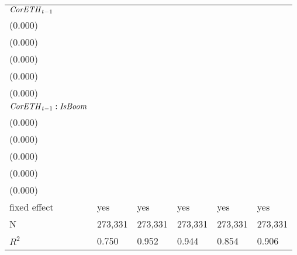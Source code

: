 \begin{tabular}{llllll}
${{\it CorETH}}_{t-1}$                      &  \makecell{$-0.000^{***}$ \\ (0.000)} &      \makecell{$0.000^{}$ \\ (0.000)} &      \makecell{$0.000^{}$ \\ (0.000)} &     \makecell{$-0.000^{}$ \\ (0.000)} &   \makecell{$-0.000^{**}$ \\ (0.000)} \\
${{\it CorETH}}_{t-1} : {\it IsBoom}$       &      \makecell{$0.000^{}$ \\ (0.000)} &     \makecell{$-0.000^{}$ \\ (0.000)} &     \makecell{$-0.000^{}$ \\ (0.000)} &      \makecell{$0.000^{}$ \\ (0.000)} &     \makecell{$-0.000^{}$ \\ (0.000)} \\
\midrule fixed effect                       &                                   yes &                                   yes &                                   yes &                                   yes &                                   yes \\
N                                           &                               273,331 &                               273,331 &                               273,331 &                               273,331 &                               273,331 \\
$R^2$                                       &                                 0.750 &                                 0.952 &                                 0.944 &                                 0.854 &                                 0.906 \\
\bottomrule
\end{tabular}
